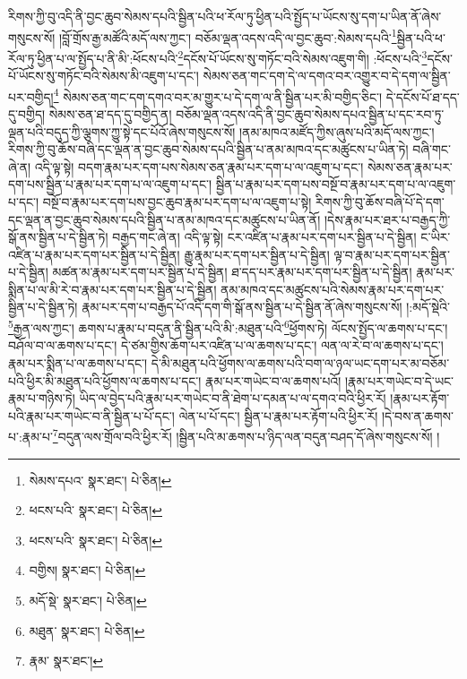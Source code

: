 རིགས་ཀྱི་བུ་འདི་ནི་བྱང་ཆུབ་སེམས་དཔའི་སྦྱིན་པའི་ཕ་རོལ་ཏུ་ཕྱིན་པའི་སྤྱོད་པ་ཡོངས་སུ་དག་པ་ཡིན་ནོ་ཞེས་གསུངས་སོ། །བློ་གྲོས་རྒྱ་མཚོའི་མདོ་ལས་ཀྱང་། བཅོམ་ལྡན་འདས་འདི་ལ་བྱང་ཆུབ་:སེམས་དཔའི་\footnote{སེམས་དཔའ་  སྣར་ཐང་།  པེ་ཅིན། }སྦྱིན་པའི་ཕ་རོལ་ཏུ་ཕྱིན་པ་ལ་སྤྱོད་པ་ནི་མི་:ཕོངས་པའི་\footnote{ཕངས་པའི་  སྣར་ཐང་།  པེ་ཅིན། }དངོས་པོ་ཡོངས་སུ་གཏོང་བའི་སེམས་འཇུག་གི། :ཕོངས་པའི་\footnote{ཕངས་པའི་  སྣར་ཐང་།  པེ་ཅིན། }དངོས་པོ་ཡོངས་སུ་གཏོང་བའི་སེམས་མི་འཇུག་པ་དང་། སེམས་ཅན་གང་དག་དེ་ལ་དགའ་བར་འགྱུར་བ་དེ་དག་ལ་སྦྱིན་པར་བགྱིད།\footnote{བགྱིས།  སྣར་ཐང་།  པེ་ཅིན། } སེམས་ཅན་གང་དག་དགའ་བར་མ་གྱུར་པ་དེ་དག་ལ་ནི་སྦྱིན་པར་མི་བགྱིད་ཅིང་། དེ་དངོས་པོ་ཐ་དད་དུ་བགྱིད། སེམས་ཅན་ཐ་དད་དུ་བགྱིད་ན། བཅོམ་ལྡན་འདས་འདི་ནི་བྱང་ཆུབ་སེམས་དཔའ་སྦྱིན་པ་དང་རབ་ཏུ་ལྡན་པའི་བདུད་ཀྱི་ལྕགས་ཀྱུ་སྟེ་དང་པོའོ་ཞེས་གསུངས་སོ། །ནམ་མཁའ་མཛོད་ཀྱིས་ཞུས་པའི་མདོ་ལས་ཀྱང་། རིགས་ཀྱི་བུ་ཆོས་བཞི་དང་ལྡན་ན་བྱང་ཆུབ་སེམས་དཔའི་སྦྱིན་པ་ནམ་མཁའ་དང་མཚུངས་པ་ཡིན་ཏེ། བཞི་གང་ཞེ་ན། འདི་ལྟ་སྟེ། བདག་རྣམ་པར་དག་པས་སེམས་ཅན་རྣམ་པར་དག་པ་ལ་འཇུག་པ་དང་། སེམས་ཅན་རྣམ་པར་དག་པས་སྦྱིན་པ་རྣམ་པར་དག་པ་ལ་འཇུག་པ་དང་། སྦྱིན་པ་རྣམ་པར་དག་པས་བསྔོ་བ་རྣམ་པར་དག་པ་ལ་འཇུག་པ་དང་། བསྔོ་བ་རྣམ་པར་དག་པས་བྱང་ཆུབ་རྣམ་པར་དག་པ་ལ་འཇུག་པ་སྟེ། རིགས་ཀྱི་བུ་ཆོས་བཞི་པོ་དེ་དག་དང་ལྡན་ན་བྱང་ཆུབ་སེམས་དཔའི་སྦྱིན་པ་ནམ་མཁའ་དང་མཚུངས་པ་ཡིན་ནོ། །དེས་རྣམ་པར་ཐར་པ་བརྒྱད་ཀྱི་སྒོ་ནས་སྦྱིན་པ་དེ་སྦྱིན་ཏེ། བརྒྱད་གང་ཞེ་ན། འདི་ལྟ་སྟེ། ངར་འཛིན་པ་རྣམ་པར་དག་པར་སྦྱིན་པ་དེ་སྦྱིན། ང་ཡིར་འཛིན་པ་རྣམ་པར་དག་པར་སྦྱིན་པ་དེ་སྦྱིན། རྒྱུ་རྣམ་པར་དག་པར་སྦྱིན་པ་དེ་སྦྱིན། ལྟ་བ་རྣམ་པར་དག་པར་སྦྱིན་པ་དེ་སྦྱིན། མཚན་མ་རྣམ་པར་དག་པར་སྦྱིན་པ་དེ་སྦྱིན། ཐ་དད་པར་རྣམ་པར་དག་པར་སྦྱིན་པ་དེ་སྦྱིན། རྣམ་པར་སྨིན་པ་ལ་མི་རེ་བ་རྣམ་པར་དག་པར་སྦྱིན་པ་དེ་སྦྱིན། ནམ་མཁའ་དང་མཚུངས་པའི་སེམས་རྣམ་པར་དག་པར་སྦྱིན་པ་དེ་སྦྱིན་ཏེ། རྣམ་པར་དག་པ་བརྒྱད་པོ་འདི་དག་གི་སྒོ་ནས་སྦྱིན་པ་དེ་སྦྱིན་ནོ་ཞེས་གསུངས་སོ། །:མདོ་སྡེའི་\footnote{མདོ་སྡེ་  སྣར་ཐང་།  པེ་ཅིན། }རྒྱན་ལས་ཀྱང་། ཆགས་པ་རྣམ་པ་བདུན་ནི་སྦྱིན་པའི་མི་:མཐུན་པའི་\footnote{མཐུན་  སྣར་ཐང་།  པེ་ཅིན། }ཕྱོགས་ཏེ། ལོངས་སྤྱོད་ལ་ཆགས་པ་དང་། བཤོལ་བ་ལ་ཆགས་པ་དང་། དེ་ཙམ་གྱིས་ཆོག་པར་འཛིན་པ་ལ་ཆགས་པ་དང་། ལན་ལ་རེ་བ་ལ་ཆགས་པ་དང་། རྣམ་པར་སྨིན་པ་ལ་ཆགས་པ་དང་། དེ་མི་མཐུན་པའི་ཕྱོགས་ལ་ཆགས་པའི་བག་ལ་ཉལ་ཡང་དག་པར་མ་བཅོམ་པའི་ཕྱིར་མི་མཐུན་པའི་ཕྱོགས་ལ་ཆགས་པ་དང་། རྣམ་པར་གཡེང་བ་ལ་ཆགས་པའོ། །རྣམ་པར་གཡེང་བ་དེ་ཡང་རྣམ་པ་གཉིས་ཏེ། ཡིད་ལ་བྱེད་པའི་རྣམ་པར་གཡེང་བ་ནི་ཐེག་པ་དམན་པ་ལ་དགའ་བའི་ཕྱིར་རོ། །རྣམ་པར་རྟོག་པའི་རྣམ་པར་གཡེང་བ་ནི་སྦྱིན་པ་པོ་དང་། ལེན་པ་པོ་དང་། སྦྱིན་པ་རྣམ་པར་རྟོག་པའི་ཕྱིར་རོ། །དེ་བས་ན་ཆགས་པ་:རྣམ་པ་\footnote{རྣམ་  སྣར་ཐང་། }བདུན་ལས་གྲོལ་བའི་ཕྱིར་རོ། །སྦྱིན་པའི་མ་ཆགས་པ་ཉིད་ལན་བདུན་བཤད་དོ་ཞེས་གསུངས་སོ། །
